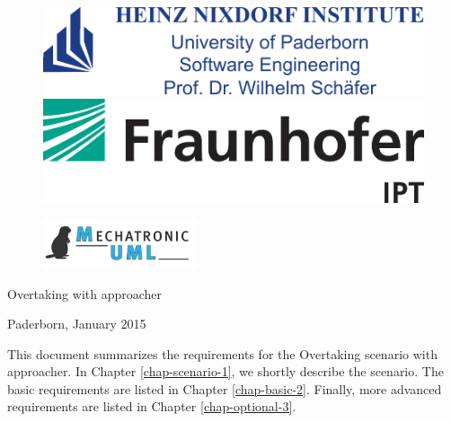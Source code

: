 \documentclass[a4paper, %
	12pt, %
	cleardoublepage=empty, %
	numbers=noenddot, %
	BCOR1.5cm
	]{scrbook} %
\title{\titleinfo}
\author{} %
\newcommand{\titleinfo}{Overtaking with approacher}
\begin{document}
\thispagestyle{empty}
\begin{titlepage}
	\begin{center}
	  

	  \begin{figure}[h!]
	  \centering
	  \begin{minipage}{.5\textwidth}
	  	\centering
	  	\includegraphics[width=.8\linewidth]{figures/hni}
	  \end{minipage}%
	  \begin{minipage}{.5\textwidth}
	  	\centering
	  	\includegraphics[width=.8\linewidth]{figures/ipt}
	  \end{minipage}
	  \end{figure}
	  \vspace{.5cm}
	  \begin{figure}[h!]
	  \centering
	  \includegraphics[width=0.4\textwidth]{figures/muml-rgb}
	  \end{figure}
	  \vspace{.5cm}
	  \begin{figure}[h!]
	  \centering


	  \end{figure}
	   	  
	  \vspace{2cm}
	  \Huge{\titleinfo}\\
	  \normalsize
	  \vspace{1cm}
	
	  \vspace{0.5cm}
	  
	  \vspace{1cm}
	  
	  \vfill
	  
	  Paderborn, January 2015
	\end{center}
\end{titlepage}

This document summarizes the requirements for the Overtaking scenario with approacher. In Chapter \ref{chap-scenario-1}, we shortly describe the scenario. The basic requirements are listed in Chapter \ref{chap-basic-2}. Finally, more advanced requirements are listed in Chapter \ref{chap-optional-3}. 









{}
\end{document}
